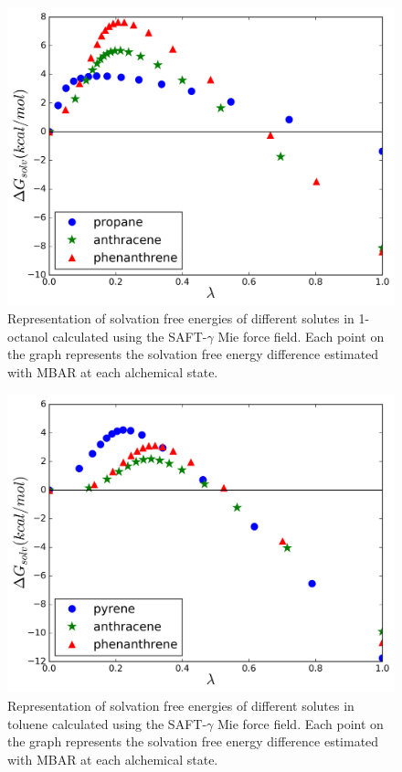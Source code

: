 \documentclass[final,12p,times,twocolumn]{elsarticle}
\begin{document}
	\begin{figure}[h]
		\centering
		\includegraphics[width=1.0\linewidth]{Figures/octart}
		\caption{Representation of solvation free energies of different solutes in 1-octanol calculated using the SAFT-$\gamma$ Mie force field. Each point on the graph represents the solvation free energy difference estimated with MBAR at each alchemical state.}
		\label{fig:oct}
	\end{figure}
	\begin{figure}[h]
		\centering
		\includegraphics[width=1.0\linewidth]{Figures/tolart}
		\caption{Representation of solvation free energies of different solutes in toluene calculated using the SAFT-$\gamma$ Mie force field. Each point on the graph represents the solvation free energy difference estimated with MBAR at each alchemical state. }
		\label{fig:tol}
	\end{figure}
\end{document}
